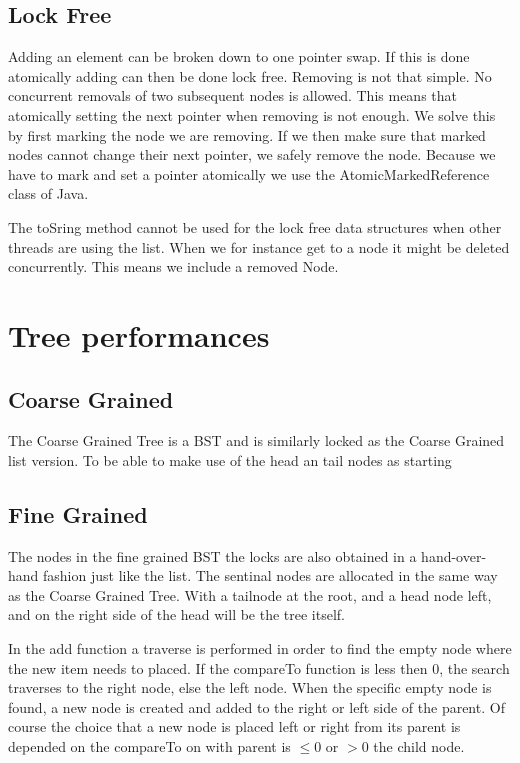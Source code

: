 \documentclass[10pt,a4paper]{article}
\begin{document}
\subsection{Lock Free}
Adding an element can be broken down to one pointer swap. If this is done atomically adding can then be done lock free. Removing is not that simple. No concurrent removals of two subsequent nodes is allowed. This means that atomically setting the next pointer when removing is not enough. We solve this by first marking the node we are removing. If we then make sure that marked nodes cannot change their next pointer, we safely remove the node. Because we have to mark and set a pointer atomically we use the AtomicMarkedReference class of Java.

The toSring method cannot be used for the lock free data structures when other threads are using the list. When we for instance get to a node it might be deleted concurrently. This means we include a removed Node.


\section{Tree performances}
\subsection{Coarse Grained}
The Coarse Grained Tree is a BST and is similarly locked as the Coarse Grained list version. To be able to make use of the head an tail nodes as starting 
\subsection{Fine Grained}
The nodes in the fine grained BST the locks are also obtained in a hand-over-hand fashion just like the list. The sentinal nodes are allocated in the same way as the Coarse Grained Tree. With a tailnode at the root, and a head node left, and on the right side of the head will be the tree itself. 

In the add function a traverse is performed in order to find the empty node where the new item needs to placed. If the compareTo function is less then 0, the search traverses to the right node, else the left node. When the specific empty node is found, a new node is created and added to the right or left side of the parent. Of course the choice that a new node is placed left or right from its parent is depended on the compareTo on with parent is \texttt{$\leq 0$} or \texttt{$> 0$} the child node. 
\end{document}
